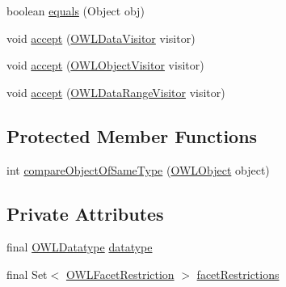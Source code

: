 \begin{DoxyCompactItemize}
\item 
boolean \hyperlink{classuk_1_1ac_1_1manchester_1_1cs_1_1owl_1_1owlapi_1_1_o_w_l_datatype_restriction_impl_ace44ff72dccd616f931b9f7fff99f7b5}{equals} (Object obj)
\item 
void \hyperlink{classuk_1_1ac_1_1manchester_1_1cs_1_1owl_1_1owlapi_1_1_o_w_l_datatype_restriction_impl_aff7f359fb5453547301aee98f89286b2}{accept} (\hyperlink{interfaceorg_1_1semanticweb_1_1owlapi_1_1model_1_1_o_w_l_data_visitor}{O\-W\-L\-Data\-Visitor} visitor)
\item 
void \hyperlink{classuk_1_1ac_1_1manchester_1_1cs_1_1owl_1_1owlapi_1_1_o_w_l_datatype_restriction_impl_a60791e47b78fcc0505923c6882c5c068}{accept} (\hyperlink{interfaceorg_1_1semanticweb_1_1owlapi_1_1model_1_1_o_w_l_object_visitor}{O\-W\-L\-Object\-Visitor} visitor)
\item 
void \hyperlink{classuk_1_1ac_1_1manchester_1_1cs_1_1owl_1_1owlapi_1_1_o_w_l_datatype_restriction_impl_a5804f86dcb142a2ffa11c6c772f7d4b5}{accept} (\hyperlink{interfaceorg_1_1semanticweb_1_1owlapi_1_1model_1_1_o_w_l_data_range_visitor}{O\-W\-L\-Data\-Range\-Visitor} visitor)
\end{DoxyCompactItemize}
\subsection*{Protected Member Functions}
\begin{DoxyCompactItemize}
\item 
int \hyperlink{classuk_1_1ac_1_1manchester_1_1cs_1_1owl_1_1owlapi_1_1_o_w_l_datatype_restriction_impl_aee1e3dbbbae6529bf34b1d107f8e3803}{compare\-Object\-Of\-Same\-Type} (\hyperlink{interfaceorg_1_1semanticweb_1_1owlapi_1_1model_1_1_o_w_l_object}{O\-W\-L\-Object} object)
\end{DoxyCompactItemize}
\subsection*{Private Attributes}
\begin{DoxyCompactItemize}
\item 
final \hyperlink{interfaceorg_1_1semanticweb_1_1owlapi_1_1model_1_1_o_w_l_datatype}{O\-W\-L\-Datatype} \hyperlink{classuk_1_1ac_1_1manchester_1_1cs_1_1owl_1_1owlapi_1_1_o_w_l_datatype_restriction_impl_a9860cd456572420d7a0e0714b0174cfd}{datatype}
\item 
final Set$<$ \hyperlink{interfaceorg_1_1semanticweb_1_1owlapi_1_1model_1_1_o_w_l_facet_restriction}{O\-W\-L\-Facet\-Restriction} $>$ \hyperlink{classuk_1_1ac_1_1manchester_1_1cs_1_1owl_1_1owlapi_1_1_o_w_l_datatype_restriction_impl_abc383f0b1ca4dc8fa0f63236fc6fc3a0}{facet\-Restrictions}
\end{DoxyCompactItemize}
